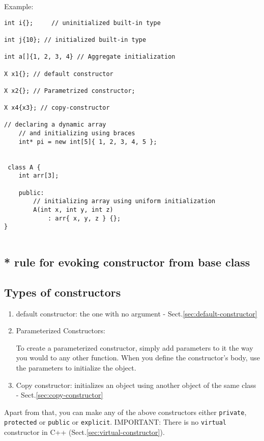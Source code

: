 Example:
\begin{lstlisting}
int i{};     // uninitialized built-in type

int j{10}; // initialized built-in type

int a[]{1, 2, 3, 4} // Aggregate initialization

X x1{}; // default constructor

X x2{}; // Parametrized constructor;

X x4{x3}; // copy-constructor

// declaring a dynamic array 
    // and initializing using braces 
    int* pi = new int[5]{ 1, 2, 3, 4, 5 }; 
    
    
 class A { 
    int arr[3]; 
  
    public: 
        // initializing array using uniform initialization 
        A(int x, int y, int z) 
            : arr{ x, y, z } {}; 
}


\end{lstlisting}



\subsection{* rule for evoking constructor from base class}

\subsection{Types of constructors}

\begin{enumerate}
  \item default constructor: the one with no argument
  - Sect.\ref{sec:default-constructor}
  
  \item Parameterized Constructors: 
  
  To create a parameterized constructor, simply add parameters to it the way you
  would to any other function. When you define the constructor’s body, use the
  parameters to initialize the object.
  
  \item Copy constructor:  initializes an object using another object of the same class - Sect.\ref{sec:copy-constructor}
  
\end{enumerate}

Apart from that, you can make any of the above constructors either
\verb!private!, \verb!protected! or \verb!public! or \verb!explicit!. IMPORTANT:
There is no \verb!virtual! constructor in C++
(Sect.\ref{sec:virtual-constructor}).


